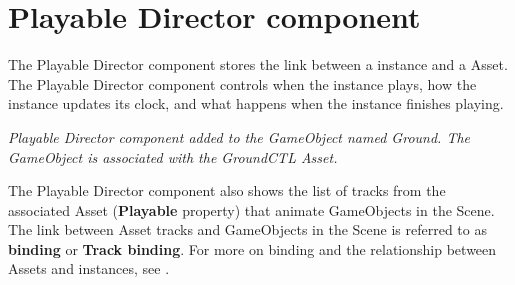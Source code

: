 \chapter{Playable Director component}
\hypertarget{md__library_2_package_cache_2com_8unity_8timeline_0d1_87_86_2_documentation_0i_2play__director}{}\label{md__library_2_package_cache_2com_8unity_8timeline_0d1_87_86_2_documentation_0i_2play__director}
\label{md__library_2_package_cache_2com_8unity_8timeline_0d1_87_86_2_documentation_0i_2play__director_autotoc_md1185}%
%
 The Playable Director component stores the link between a  instance and a  Asset. The Playable Director component controls when the  instance plays, how the  instance updates its clock, and what happens when the  instance finishes playing.



{\itshape Playable Director component added to the Game\+Object named Ground. The Game\+Object is associated with the Ground\+CTL  Asset.}

The Playable Director component also shows the list of tracks from the associated  Asset ({\bfseries{Playable}} property) that animate Game\+Objects in the Scene. The link between  Asset tracks and Game\+Objects in the Scene is referred to as {\bfseries{binding}} or {\bfseries{Track binding}}. For more on binding and the relationship between  Assets and  instances, see .

